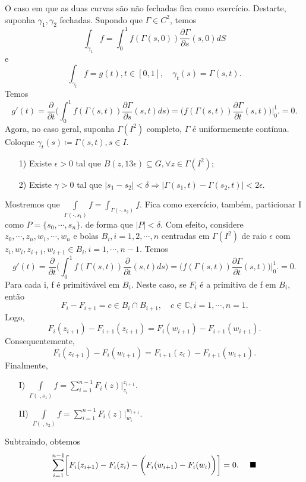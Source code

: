 \documentclass[complex.tex]{subfiles}
\begin{document}
\begin{proof*}
	O caso em que as duas curvas são não fechadas fica como exercício. Destarte, suponha $\gamma_{1}, \gamma_{2}$ fechadas.
	Supondo que $\Gamma\in{C^{2}}$, temos
	$$
		\int_{\gamma_{1}}^{}f = \int_{0}^{1}f(\Gamma(s, 0))\frac{\partial{\Gamma}}{\partial{s}}(s, 0)dS
	$$
	e
	$$
		\int_{\gamma_{t}}^{}f = g(t), t\in[0, 1], \quad \gamma_{t}(s) = \Gamma(s, t).
	$$
	Temos
	$$
		g'(t) = \frac{\partial{}}{\partial{t}}\biggl(\int_{0}^{1}f(\Gamma(s, t))\frac{\partial{\Gamma}}{\partial{s}}(s, t)ds\biggr) = \biggl(f(\Gamma(s,t ))\frac{\partial{\Gamma}}{\partial{t}}(s, t)\biggr)\biggl|_0^1\biggr. = 0.
	$$
	Agora, no caso geral, suponha $\Gamma(I^2)$ completo, $\Gamma$ é uniformemente contínua. Coloque $\gamma_{t}(s)\coloneqq  \Gamma(s, t), s\in{I}.$
	\begin{itemize}
		\item[1)] Existe $\epsilon > 0$ tal que $B(z, 13 \epsilon)\subseteq{G},\forall z\in{\Gamma(I^2)};$
		\item[2)] Existe $\gamma > 0$ tal que $|s_1 - s_2| < \delta\Rightarrow |\Gamma(s_1, t) - \Gamma(s_2, t)| < 2 \epsilon.$
	\end{itemize}
	Mostremos que $\int\limits_{\Gamma(\cdot, s_1)}^{}f = \int_{\Gamma(\cdot, s_2)}^{}f.$ Fica como exercício, também, particionar
	I como $P=\{s_{0}, \cdots, s_{n}\}.$ de forma que $|P| < \delta.$ Com efeito, considere $z_{0}, \cdots, z_{n}, w_{1}, \cdots, w_{n}$ e bolas
	$B_{i}, i = 1, 2, \cdots, n$ centradas em $\Gamma(I^2)$ de raio $\epsilon$ com $z_{i}, w_{i}, z_{i+1}, w_{i+1}\in{B_{i}}, i = 1, \cdots, n-1.$
	Temos
	$$
		g'(t) = \frac{\partial{}}{\partial{t}}\biggl(\int_{0}^{1}f(\Gamma(s, t))\frac{\partial{}}{\partial{t}}(s, t)ds\biggr) = \biggl(f(\Gamma(s, t))\frac{\partial{\Gamma}}{\partial{t}}(s, t)\biggr)\biggl|_0^1\biggr. = 0.
	$$
	Para cada i, f é primitivável em $B_{i}.$ Neste caso, se $F_{i}$ é a primitiva de f em $B_{i}$, então
	$$
		F_{i} - F_{i+1} = c \in B_{i}\cap{B_{i+1}}, \quad c\in \mathbb{C}, i=1, \cdots, n=1.
	$$
	Logo,
	$$
		F_{i}(z_{i+1}) - F_{i+1}(z_{i+1}) = F_{i}(w_{i+1}) - F_{i+1}(w_{i+1}).
	$$
	Consequentemente,
	$$
		F_{i}(z_{i+1}) - F_{i}(w_{i+1}) = F_{i+1}(z_{i}) - F_{i+1}(w_{i+1}).
	$$
	Finalmente,
	\begin{itemize}
		\item[I)] $\int\limits_{\Gamma(\cdot, s_{1})}^{}f = \sum\limits_{i=1}^{n-1}F_{i}(z)\biggl|_{z_{i}}^{z_{i+1}}\biggr.$
		\item[II)] $\int\limits_{\Gamma(\cdot, s_2)}^{}f = \sum\limits_{i=1}^{n-1}F_{i}(z)\biggl|_{w_{i}}^{w_{i+1}}\biggr.$
	\end{itemize}
	Subtraindo, obtemos
	$$
		\sum\limits_{i=1}^{n-1}\biggl[F_{i}(z_{i+1}) - F_{i}(z_{i}) - \biggl(F_{i}(w_{i+1}) - F_{i}(w_{i})\biggr)\biggr] = 0.\quad\text{ $\blacksquare$}
	$$
\end{proof*}
\end{document}
